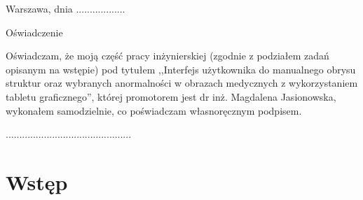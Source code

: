 \documentclass[a4paper,11pt,twoside,openright]{report}
\theoremstyle{definition}
\newcommand{\tytul}{Interfejs użytkownika do manualnego obrysu struktur oraz wybranych anormalności w obrazach medycznych z wykorzystaniem tabletu graficznego}
\newcommand{\type}{inżyniers} %
\newcommand{\supervisor}{dr inż. Magdalena Jasionowska}
\begin{document}


\null\thispagestyle{empty}\newpage

\null \hfill Warszawa, dnia ..................\\

\par\vspace{5cm}

\begin{center}
Oświadczenie
\end{center}

\indent Oświadczam, że moją część pracy \type kiej (zgodnie z podziałem zadań opisanym na wstępie) pod
tytułem ,,\tytul '', której promotorem jest \supervisor , wykonałem
samodzielnie, co poświadczam własnoręcznym podpisem.
\vspace{2cm}


\begin{flushright}
  \begin{minipage}{50mm}
    \begin{center}
      ..............................................

    \end{center}
  \end{minipage}
\end{flushright}

\thispagestyle{empty}
\newpage

\null\thispagestyle{empty}\newpage


\tableofcontents
\thispagestyle{empty}


\null\thispagestyle{empty}\newpage
\pagestyle{fancy}
\setcounter{page}{11} %

\chapter*{Wstęp}
\end{document}
